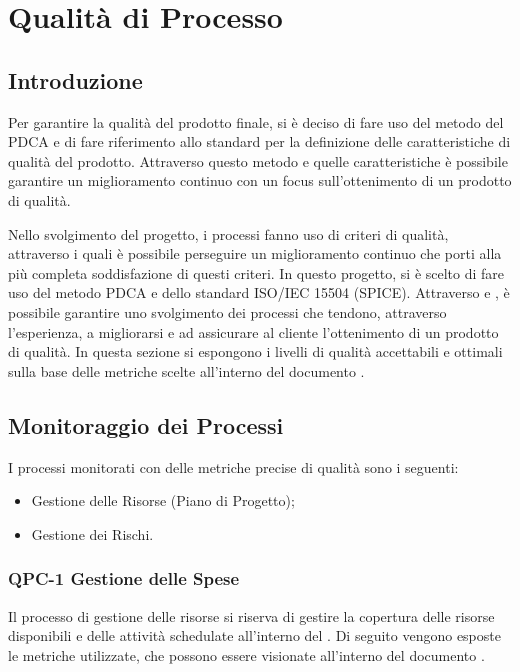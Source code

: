 \section{Qualità di Processo}

\subsection{Introduzione}

Per garantire la qualità del prodotto finale, si è deciso di fare uso del metodo del PDCA  e di fare riferimento allo standard  per la definizione delle caratteristiche di qualità del prodotto.
Attraverso questo metodo e quelle caratteristiche è possibile garantire un miglioramento continuo con un focus sull'ottenimento di un prodotto di qualità.


Nello svolgimento del progetto, i processi fanno uso di criteri di qualità, attraverso i quali è possibile perseguire un miglioramento continuo che porti alla più completa soddisfazione di questi criteri. In questo progetto, si è scelto di fare uso del metodo PDCA e dello standard ISO/IEC 15504 (SPICE). Attraverso  e , è possibile garantire uno svolgimento dei processi che tendono, attraverso l'esperienza, a migliorarsi e ad assicurare al cliente l'ottenimento di un prodotto di qualità.
In questa sezione si espongono i livelli di qualità accettabili e ottimali sulla base delle metriche scelte all'interno del documento .

\subsection{Monitoraggio dei Processi}

I processi monitorati con delle metriche precise di qualità sono i seguenti:

\begin{itemize}
	\item Gestione delle Risorse (Piano di Progetto);
	\item Gestione dei Rischi.
\end{itemize}

	\subsubsection{QPC-1 Gestione delle Spese}

		Il processo di gestione delle risorse si riserva di gestire la copertura delle risorse disponibili e delle attività schedulate all'interno del . 
		Di seguito vengono esposte le metriche utilizzate, che possono essere visionate all'interno del documento .

